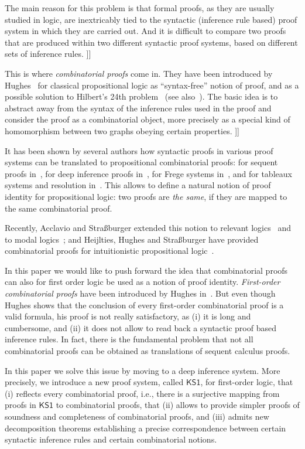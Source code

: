 \documentclass[conference,twosided,10pt]{IEEEtran}
\newcommand{\lutz}[1]{{\color{blue}     \noindent[\![\![{\bf Lutz: }#1]\!]\!]}}
\theoremstyle{definition}
\newcommand*{\FOKS}{\mathsf{KS1}}
\begin{document}
The main reason for this problem is that formal proofs, as they are
usually studied in logic, are inextricably tied to the syntactic
(inference rule based) proof system in which they are carried out. And
it is difficult to compare two proofs that are produced within two
different syntactic proof systems, based on different sets of inference rules.
\lutz{an example here?}

This is where \emph{combinatorial proofs} come in. They have been
introduced by Hughes~\cite{hughes:pws} for classical propositional
logic as ``syntax-free'' notion of proof, and as a possible solution
to Hilbert's 24th problem~\cite{hughes:invar} (see
also~\cite{str:hilbert:24}). The basic idea is to abstract away from
the syntax of the inference rules used in the proof and consider the
proof as a combinatorial object, more precisely as a special kind of
homomorphism between two graphs obeying certain properties.
\lutz{an example here?}

It has been shown by several authors how syntactic proofs in various
proof systems can be translated to propositional combinatorial proofs:
for sequent proofs in~\cite{hughes:invar}, for deep inference proofs
in~\cite{str:fscd17}, for Frege systems in~\cite{str:RR-9048}, and for
tableaux systems and resolution in~\cite{acc:str:18}. This allows to
define a natural notion of proof identity for propositional logic: two
proofs are \emph{the same}, if they are mapped to the same
combinatorial proof.

Recently, Acclavio and Stra\ss burger extended this notion to relevant
logics~\cite{acc:str:relevant} and to modal
logics~\cite{acc:str:modal}; and Heijlties, Hughes and Stra\ss burger
have provided combinatorial proofs for intuitionistic propositional
logic~\cite{HHS:lics19}.

In this paper we would like to push forward the idea that
combinatorial proofs can also for first order logic be used as a
notion of proof identity. \emph{First-order combinatorial proofs} have
been introduced by Hughes in~\cite{hughes:fopws}. But even though
Hughes shows that the conclusion of every first-order combinatorial
proof is a valid formula, his proof is not really satisfactory, as (i)
it is long and cumbersome, and (ii) it does not allow to read back a
syntactic proof based inference rules. In fact, there is the
fundamental problem that not all combinatorial proofs can be obtained
as translations of sequent calculus proofs.

In this paper we solve this issue by moving to a deep inference
system. More precisely, we introduce a new proof system, called
$\FOKS$, for first-order logic, that (i) reflects every combinatorial
proof, i.e., there is a surjective mapping from proofs in $\FOKS$ to
combinatorial proofs, that (ii) allows to provide simpler proofs of
soundness and completeness of combinatorial proofs, and (iii) admits
new decomposition theorems establishing a precise correspondence
between certain syntactic inference rules and certain combinatorial
notions.
\end{document}
